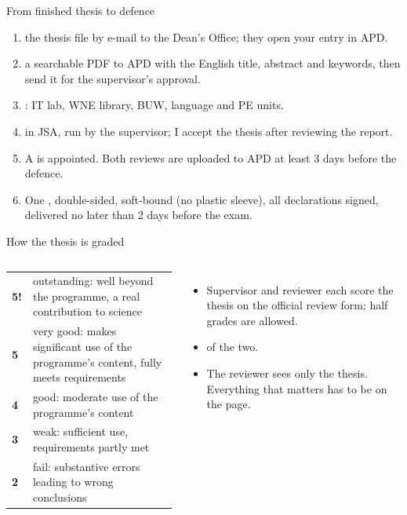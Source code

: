 \documentclass[aspectratio=169,11pt,t]{beamer}
\begin{document}
\begin{frame}{From finished thesis to defence}
  \begin{enumerate}
    \item {} the thesis file by e-mail to the Dean's Office; they open your entry in APD.
    \item {} a searchable PDF to APD with the English title, abstract and keywords, then
          send it for the supervisor's approval.
    \item {}: IT lab, WNE library, BUW, language and PE units.
    \item {} in JSA, run by the supervisor; I accept the thesis after
          reviewing the report.
    \item A  is appointed. Both reviews are uploaded to APD at least 3 days before
          the defence.
    \item One , double-sided, soft-bound (no plastic sleeve), all declarations
          signed, delivered no later than 2 days before the exam.
  \end{enumerate}
\end{frame}

\begin{frame}{How the thesis is graded}
  \begin{columns}[T,onlytextwidth]
    \small
    \begin{tabular}{@{}lp{}@{}}
      \toprule
      \textbf{5!} & outstanding: well beyond the programme, a real contribution to science \\
      \textbf{5}  & very good: makes significant use of the programme's content, fully meets requirements \\
      \textbf{4}  & good: moderate use of the programme's content \\
      \textbf{3}  & weak: sufficient use, requirements partly met \\
      \textbf{2}  & fail: substantive errors leading to wrong conclusions \\
      \bottomrule
    \end{tabular}
    \begin{itemize}
      \item Supervisor and reviewer each score the thesis on the official review form;
            half grades are allowed.
      \item {} of the two.
      \item The reviewer sees only the thesis. Everything that matters has to be on the page.
    \end{itemize}
  \end{columns}
\end{frame}
\end{document}
